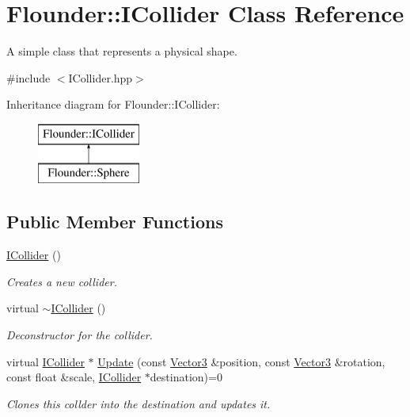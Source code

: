 \hypertarget{class_flounder_1_1_i_collider}{}\section{Flounder\+:\+:I\+Collider Class Reference}
\label{class_flounder_1_1_i_collider}


A simple class that represents a physical shape.  




{\ttfamily \#include $<$I\+Collider.\+hpp$>$}

Inheritance diagram for Flounder\+:\+:I\+Collider\+:\begin{figure}[H]
\begin{center}
\leavevmode
\includegraphics[height=2.000000cm]{class_flounder_1_1_i_collider}
\end{center}
\end{figure}
\subsection*{Public Member Functions}
\begin{DoxyCompactItemize}
\item 
\hyperlink{class_flounder_1_1_i_collider_a59d35edf3457f1f0bfd87fe858a07fd8}{I\+Collider} ()
\begin{DoxyCompactList}\small\item\em Creates a new collider. \end{DoxyCompactList}\item 
virtual \hyperlink{class_flounder_1_1_i_collider_a4f2b3bd9e22b1b74391068daa0b3a038}{$\sim$\+I\+Collider} ()
\begin{DoxyCompactList}\small\item\em Deconstructor for the collider. \end{DoxyCompactList}\item 
virtual \hyperlink{class_flounder_1_1_i_collider}{I\+Collider} $\ast$ \hyperlink{class_flounder_1_1_i_collider_aee68579a002a36bd19417b78c5c29871}{Update} (const \hyperlink{class_flounder_1_1_vector3}{Vector3} \&position, const \hyperlink{class_flounder_1_1_vector3}{Vector3} \&rotation, const float \&scale, \hyperlink{class_flounder_1_1_i_collider}{I\+Collider} $\ast$destination)=0
\begin{DoxyCompactList}\small\item\em Clones this collder into the destination and updates it. \end{DoxyCompactList}\end{DoxyCompactItemize}


